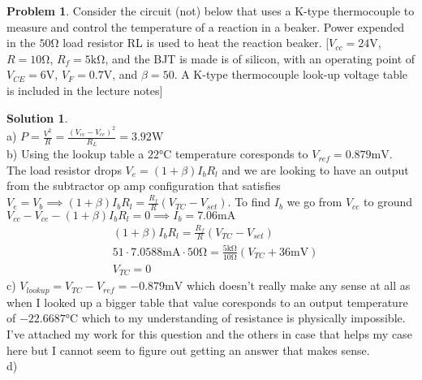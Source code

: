 \documentclass[10pt]{article}
\theoremstyle{definition}
\newtheorem{problem}{Problem}
\newtheorem{soln}{Solution}
\begin{document}
\begin{problem}
Consider the circuit (not) below that uses a K-type thermocouple to measure and control
the temperature of a reaction in a beaker. Power expended in the $50\unit\ohm$ load resistor
RL is used to heat the reaction beaker.
  [$V_{cc}=24\unit{\volt}$, $R=10\unit{\ohm}$, $R_f=5\unit{\kilo\ohm}$, and the BJT is made is of silicon, with an operating
    point of $V_{CE}=6 \unit\volt$, $V_F=0.7\unit\volt$, and
    $\beta=50$. A K-type thermocouple look-up voltage
    table is included in the lecture notes]
\end{problem}
\begin{soln} ~\\
a) $P=\frac{V^2}{R}=\frac{(V_{cc}-V_{ce})^2}{R_L}=3.92\unit{\watt}$\\
b) Using the lookup table a $22\unit{\degreeCelsius}$ temperature coresponds to $V_{ref}=0.879\unit{\milli\volt}$. The load resistor drops $V_e=\left(1+\beta\right)I_bR_l$
and we are looking to have an output from the subtractor op amp configuration that satisfies $V_e=V_b\implies\left(1+\beta\right)I_bR_l=\frac{R_f}{R}\left(V_{TC}-V_{set}\right)$.
To find $I_b$ we go from $V_{cc}$ to ground $V_{cc}-V_{ce}-\left(1+\beta\right)I_bR_l=0\implies I_b=7.06\unit{\milli\ampere}$
\begin{align*}
  & \left(1+\beta\right)I_bR_l=\frac{R_f}{R}\left(V_{TC}-V_{set}\right)\\
  & 51\cdot7.0588\unit{\milli\ampere}\cdot50\unit{\ohm}=\frac{5\unit{\kilo\ohm}}{10\unit{\ohm}}\left(V_{TC}+36\unit{\milli\volt}\right)\\
  & V_{TC}=0
\end{align*}
c) $V_{lookup}=V_{TC}-V_{ref}=-0.879\unit{\milli\volt}$ which doesn't really make any sense at all as when I looked up a bigger table that value coresponds to an output temperature of $-22.6687\unit{\degreeCelsius}$
which to my understanding of resistance is physically impossible. I've attached my work for this question and the others in case that helps my case here but I cannot seem to figure out getting an answer that makes sense.\\
d) 
\end{soln}
\end{document}
